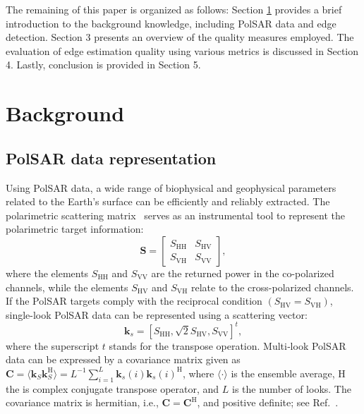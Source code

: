 \documentclass{article}
\begin{document}
The remaining of this paper is organized as follows: Section \ref{sec_2} provides a brief introduction to the background knowledge, including PolSAR data and edge detection. Section 3 presents an overview of the quality measures employed. The evaluation of edge estimation quality using various metrics is discussed in Section 4. Lastly, conclusion is provided in Section 5.


\section{Background}\label{sec_2}
\vspace{-0.2cm}
\subsection{PolSAR data representation}
Using PolSAR data, a wide range of biophysical and geophysical parameters related to the Earth's surface can be efficiently and reliably extracted. The polarimetric scattering matrix~\cite{Lee2017} serves as an instrumental tool to represent the polarimetric target information:
\begin{equation}
 \mathbf{S} = \begin{bmatrix}
S_{\text{HH}} & S_{\text{HV}} \\
S_{\text{VH}} & S_{\text{VV}}
\end{bmatrix},  
\label{E:a1}
\end{equation}
where the elements $S_{\text{HH}}$ and $S_{\text{VV}}$ are the returned power in the co-polarized channels, while the elements $S_{\text{HV}}$ and $S_{\text{VH}}$ relate to the cross-polarized channels.
If the PolSAR targets comply with the reciprocal condition $(S_{\text{HV}} = S_{\text{VH}})$, single-look PolSAR data can be represented using a scattering vector:
\begin{equation}
\mathbf{k}_s=[S_{\text{HH}}, \sqrt{2}S_{\text{HV}}, S_{\text{VV}} ]^t,
\label{E:21}
\end{equation}
where  the superscript $t$ stands for the transpose operation. 
Multi‑look PolSAR data can be expressed  by a covariance matrix  given as 
\(\mathbf{C}=\langle\mathbf{k}_S\mathbf{k}_S^\text{H} \rangle= {L}^{-1} \sum_{i=1}^{L} \mathbf{k}_s(i)\mathbf{k}_s(i)^\text{H} \), where $\langle \cdot \rangle$ is the ensemble average, $\text{H}$  the is complex conjugate transpose operator, and $L$ is the number of looks. 
The covariance matrix is hermitian, i.e., $\mathbf{C}= \mathbf{C}^\text{H}$, and positive definite;
see Ref.~\cite{Qin2022}.
\end{document}
